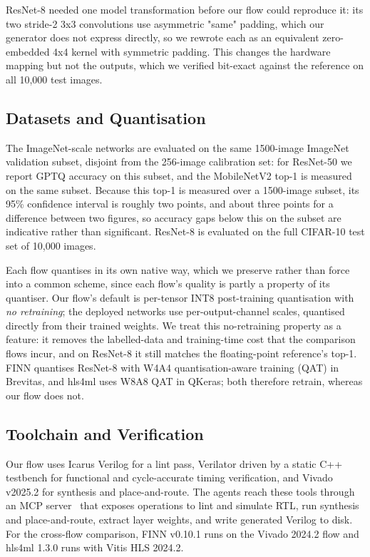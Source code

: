 \documentclass[acmtog,authorversion]{acmart}
\begin{document}
ResNet-8 needed one model transformation before our flow could reproduce it: its two stride-2 3x3 convolutions use asymmetric "same" padding, which our generator does not express directly, so we rewrote each as an equivalent zero-embedded 4x4 kernel with symmetric padding. This changes the hardware mapping but not the outputs, which we verified bit-exact against the reference on all 10,000 test images.

\subsection{Datasets and Quantisation}

The ImageNet-scale networks are evaluated on the same 1500-image ImageNet validation subset, disjoint from the 256-image calibration set: for ResNet-50 we report GPTQ accuracy on this subset, and the MobileNetV2 top-1 is measured on the same subset. Because this top-1 is measured over a 1500-image subset, its 95\% confidence interval is roughly two points, and about three points for a difference between two figures, so accuracy gaps below this on the subset are indicative rather than significant. ResNet-8 is evaluated on the full CIFAR-10 test set of 10,000 images.

Each flow quantises in its own native way, which we preserve rather than force into a common scheme, since each flow's quality is partly a property of its quantiser. Our flow's default is per-tensor INT8 post-training quantisation with \emph{no retraining}; the deployed networks use per-output-channel scales, quantised directly from their trained weights. We treat this no-retraining property as a feature: it removes the labelled-data and training-time cost that the comparison flows incur, and on ResNet-8 it still matches the floating-point reference's top-1. FINN quantises ResNet-8 with W4A4 quantisation-aware training (QAT) in Brevitas, and hls4ml uses W8A8 QAT in QKeras; both therefore retrain, whereas our flow does not.

\subsection{Toolchain and Verification}

Our flow uses Icarus Verilog for a lint pass, Verilator driven by a static C++ testbench for functional and cycle-accurate timing verification, and Vivado v2025.2 for synthesis and place-and-route. The agents reach these tools through an MCP server~\cite{anthropic2025mcp} that exposes operations to lint and simulate RTL, run synthesis and place-and-route, extract layer weights, and write generated Verilog to disk. For the cross-flow comparison, FINN v0.10.1 runs on the Vivado 2024.2 flow and hls4ml 1.3.0 runs with Vitis HLS 2024.2.
\end{document}
